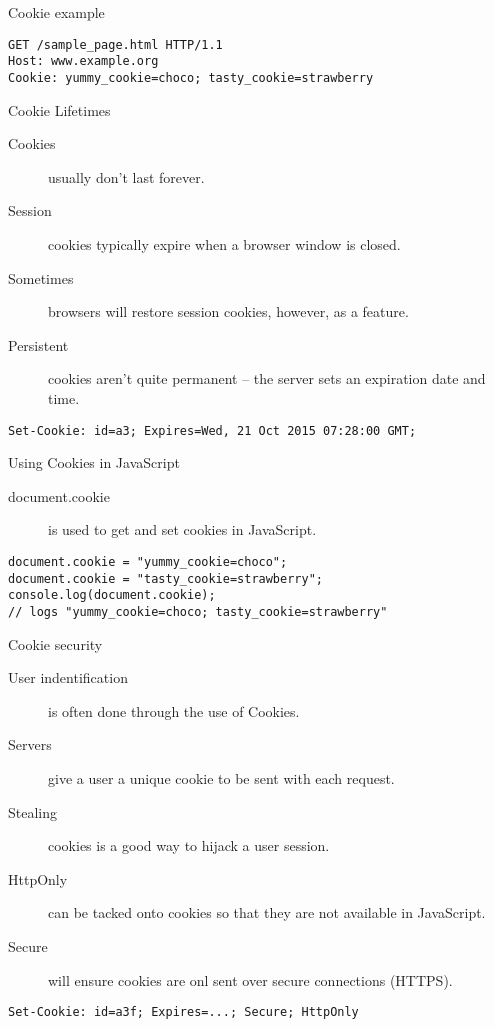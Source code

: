 \begin{frame}[fragile]{Cookie example}
  \begin{verbatim}
GET /sample_page.html HTTP/1.1
Host: www.example.org
Cookie: yummy_cookie=choco; tasty_cookie=strawberry
  \end{verbatim}
\end{frame}


\begin{frame}[fragile]{Cookie Lifetimes}
  \begin{description}
    \item[Cookies] usually don't last forever.
		\item[Session] cookies typically expire when a browser window is closed.
		\item[Sometimes] browsers will restore session cookies, however, as a feature.
		\item[Persistent] cookies aren't quite permanent -- the server sets an expiration date and time.
  \end{description}
	\hr
  \begin{verbatim}
Set-Cookie: id=a3; Expires=Wed, 21 Oct 2015 07:28:00 GMT;
  \end{verbatim}
\end{frame}


\begin{frame}[fragile]{Using Cookies in JavaScript}
  \begin{description}
    \item[document.cookie] is used to get and set cookies in JavaScript.
  \end{description}
	\hr
  \begin{verbatim}
document.cookie = "yummy_cookie=choco"; 
document.cookie = "tasty_cookie=strawberry"; 
console.log(document.cookie); 
// logs "yummy_cookie=choco; tasty_cookie=strawberry"
  \end{verbatim}
\end{frame}


\begin{frame}[fragile]{Cookie security}
  \begin{description}
    \item[User indentification] is often done through the use of Cookies.
		\item[Servers] give a user a unique cookie to be sent with each request.
		\item[Stealing] cookies is a good way to hijack a user session.
		\item[HttpOnly] can be tacked onto cookies so that they are not available in JavaScript.
		\item[Secure] will ensure cookies are onl sent over secure connections (HTTPS).
  \end{description}
	\hr
  \begin{verbatim}
Set-Cookie: id=a3f; Expires=...; Secure; HttpOnly
  \end{verbatim}
\end{frame}


